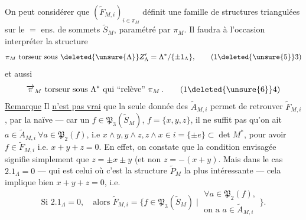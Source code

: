  On peut considérer que $(\widetilde F_{M,i})_{i\in\pi_M}$ définit une famille de structures triangulées sur le $=$ ens. de sommets $\widetilde S_M$, paramétré par $\pi_M$.
Il faudra à l'occasion interpréter la structure
\[
 \pi_M\text{ torseur sous }\deleted{\unsure{\Lambda}} Z'_{\Lambda}=\Lambda^*/\{\pm1_\Lambda\},\tag*{(1\deleted{\unsure{5}}3)}
\]
et aussi
\[
 \overrightarrow\pi_M\text{ torseur sous }\Lambda^*\text{ qui ``relève'' }\pi_M\,.\tag*{(1\deleted{\unsure{6}}4)}
\]
\uline{Remarque} Il \uline{n'est pas vrai} que la seule donnée des $\widetilde A_{M,i}$ permet de retrouver  $\widetilde F_{M,i}$, par la  naïve --- car  un $f\in\mathfrak P_3(\widetilde S_M)$, $f=\{x,y,z\}$, il ne suffit pas qu'on ait $a\in\widetilde A_{M,i}\ \forall a\in\mathfrak P_2(f)$, i.e $x\wedge y,y\wedge z,z\wedge x\in i=\{\pm e\}\subset\det M^*$, pour avoir $f\in\widetilde F_{M,i}$ i.e. $x+y+z=0$. En effet, on constate que la condition envisagée signifie simplement que $z=\pm x\pm y$ (et non $z=-(x+y)$.
Mais dans le cas $2.1_\Lambda=0$ --- qui est celui où c'est la structure $\widetilde P_M$   la plus intéressante --- cela implique bien $x+y+z=0$, i.e.
\[
 \text{Si }2.1_\Lambda=0,\quad\text{alors }\widetilde F_{M,i}=\bigl\{f\in\mathfrak P_3(\widetilde S_M)\mid
 \substack{\forall a\in\mathfrak P_2(f),\\\text{on a }a\in\widetilde A_{M,i}}\bigr\}.\tag*{(15)}
\]

